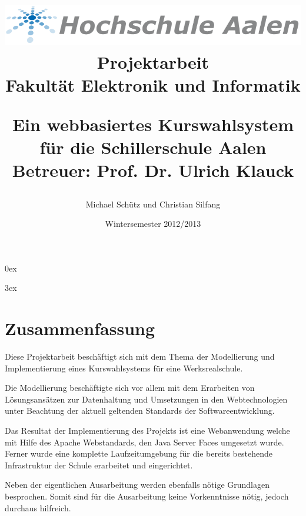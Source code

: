 \documentclass[12pt, twoside, a4paper, ngerman]{article}
\title{
	\begin{center}
		\Huge{\includegraphics[scale=0.5]{img/logo_htw_aalen.png}}\\
		\large{Projektarbeit}\\
		\large{Fakultät Elektronik und Informatik}\\
	\end{center}
	\vspace{3cm}
	\begin{center}
		\Huge{Ein webbasiertes Kurswahlsystem für die Schillerschule Aalen}\\
		\vspace{1.5cm}
		\large{Betreuer: Prof. Dr. Ulrich Klauck}
		\vfill
	\end{center}
}
\author{Michael Schütz und Christian Silfang}
\date{\Huge{Wintersemester 2012/2013}}
\begin{document}
  
	\parindent0ex
	
	\parskip3ex
	
	\newpage
	
	\pagestyle{empty}
	\maketitle
	\thispagestyle{empty}
	\cleardoublepage
	\newpage
	
	\vspace{10cm}
	\section*{Zusammenfassung}
	
\pagestyle{fancy}
	\renewcommand{\sectionmark}[1]{\markboth{#1}{}}
	\fancyhf{}
	\fancyhead[EL]{ { }\leftmark}
	\fancyhead[OR]{\thepage}
	\renewcommand{\headrulewidth}{0.4pt}

Diese Projektarbeit beschäftigt sich mit dem Thema der Modellierung und Implementierung 
eines Kurswahlsystems für eine Werksrealschule.

Die Modellierung beschäftigte sich vor allem mit dem Erarbeiten von Lösungsansätzen zur Datenhaltung und Umsetzungen in den Webtechnologien unter Beachtung der aktuell geltenden Standards der Softwareentwicklung.

Das Resultat der Implementierung des Projekts ist eine Webanwendung welche mit Hilfe des Apache Webstandards, den Java Server Faces
umgesetzt wurde.
Ferner wurde eine komplette Laufzeitumgebung für die bereits bestehende Infrastruktur der Schule erarbeitet und eingerichtet.

Neben der eigentlichen Ausarbeitung werden ebenfalls nötige Grundlagen besprochen. Somit sind für die Ausarbeitung keine Vorkenntnisse nötig, jedoch durchaus hilfreich.
	\cleardoublepage
	
	\newpage
	\tableofcontents
	\cleardoublepage
	
	\printnomenclature
	\cleardoublepage
	\pagestyle{fancy}
	\renewcommand{\sectionmark}[1]{\markboth{#1}{}}
	\fancyhf{}
	\fancyhead[EL]{\thesection { }\leftmark}
	\fancyhead[OR]{{ }\rightmark}
	\renewcommand{\headrulewidth}{0.4pt}
	
  	\fancyfoot[EL]{\textbf{\thepage}}
	\fancyfoot[OR]{\textbf{\thepage}} 
% 	
	
	\setcounter{page}{1}
\end{document}
